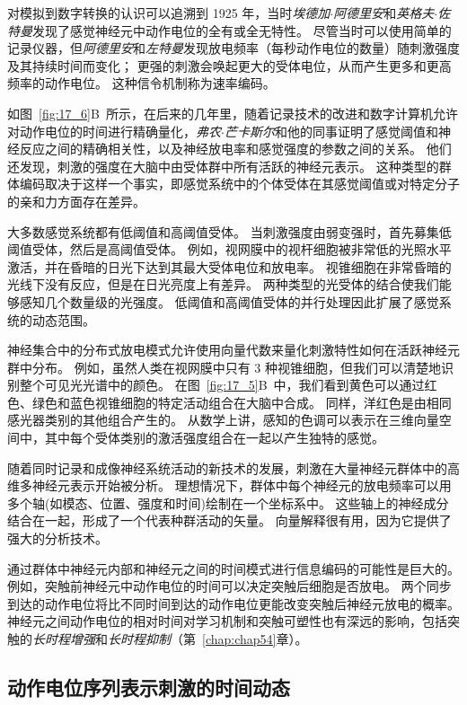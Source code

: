 对模拟到数字转换的认识可以追溯到 1925 年，当时\textit{埃德加$\cdot$阿德里安}和\textit{英格夫$\cdot$佐特曼}发现了感觉神经元中动作电位的全有或全无特性。 
尽管当时可以使用简单的记录仪器，但\textit{阿德里安}和\textit{左特曼}发现放电频率（每秒动作电位的数量）随刺激强度及其持续时间而变化； 
更强的刺激会唤起更大的受体电位，从而产生更多和更高频率的动作电位。 
这种信令机制称为速率编码。


如图~\ref{fig:17_6}B~所示，在后来的几年里，随着记录技术的改进和数字计算机允许对动作电位的时间进行精确量化，\textit{弗农$\cdot$芒卡斯尔}和他的同事证明了感觉阈值和神经反应之间的精确相关性，以及神经放电率和感觉强度的参数之间的关系。
他们还发现，刺激的强度在大脑中由受体群中所有活跃的神经元表示。
这种类型的群体编码取决于这样一个事实，即感觉系统中的个体受体在其感觉阈值或对特定分子的亲和力方面存在差异。


大多数感觉系统都有低阈值和高阈值受体。 
当刺激强度由弱变强时，首先募集低阈值受体，然后是高阈值受体。 
例如，视网膜中的视杆细胞被非常低的光照水平激活，并在昏暗的日光下达到其最大受体电位和放电率。 
视锥细胞在非常昏暗的光线下没有反应，但是在日光亮度上有差异。 
两种类型的光受体的结合使我们能够感知几个数量级的光强度。 
低阈值和高阈值受体的并行处理因此扩展了感觉系统的动态范围。


神经集合中的分布式放电模式允许使用向量代数来量化刺激特性如何在活跃神经元群中分布。 
例如，虽然人类在视网膜中只有 3 种视锥细胞，但我们可以清楚地识别整个可见光光谱中的颜色。
在图~\ref{fig:17_5}B~中，我们看到黄色可以通过红色、绿色和蓝色视锥细胞的特定活动组合在大脑中合成。
同样，洋红色是由相同感光器类别的其他组合产生的。 
从数学上讲，感知的色调可以表示在三维向量空间中，其中每个受体类别的激活强度组合在一起以产生独特的感觉。


随着同时记录和成像神经系统活动的新技术的发展，刺激在大量神经元群体中的高维多神经元表示开始被分析。
理想情况下，群体中每个神经元的放电频率可以用多个轴(如模态、位置、强度和时间)绘制在一个坐标系中。
这些轴上的神经成分结合在一起，形成了一个代表种群活动的矢量。
向量解释很有用，因为它提供了强大的分析技术。


通过群体中神经元内部和神经元之间的时间模式进行信息编码的可能性是巨大的。
例如，突触前神经元中动作电位的时间可以决定突触后细胞是否放电。
两个同步到达的动作电位将比不同时间到达的动作电位更能改变突触后神经元放电的概率。
神经元之间动作电位的相对时间对学习机制和突触可塑性也有深远的影响，包括突触的\textit{长时程增强}和\textit{长时程抑制}（第~\ref{chap:chap54}章）。



\subsection{动作电位序列表示刺激的时间动态}

